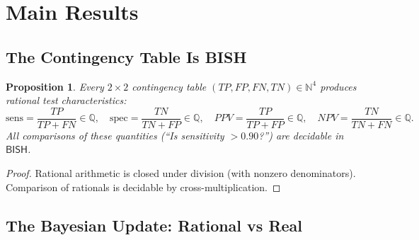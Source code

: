 \documentclass[11pt,a4paper]{article}
\theoremstyle{plain}
\newtheorem{proposition}[theorem]{Proposition}
\theoremstyle{definition}
\newcommand{\BISH}{\textsf{BISH}}
\newcommand{\Q}{\mathbb{Q}}
\newcommand{\N}{\mathbb{N}}
\begin{document}
\section{Main Results}\label{sec:main}

\subsection{The Contingency Table Is BISH}

\begin{proposition}\label{prop:ct-bish}
Every $2 \times 2$ contingency table $(TP, FP, FN, TN) \in \N^4$ produces rational test characteristics:
\[
  \mathrm{sens} = \frac{TP}{TP + FN} \in \Q, \quad
  \mathrm{spec} = \frac{TN}{TN + FP} \in \Q, \quad
  PPV = \frac{TP}{TP + FP} \in \Q, \quad
  NPV = \frac{TN}{TN + FN} \in \Q.
\]
All comparisons of these quantities (``Is sensitivity $> 0.90$?'') are decidable in $\BISH$.
\end{proposition}

\begin{proof}
Rational arithmetic is closed under division (with nonzero denominators).  Comparison of rationals is decidable by cross-multiplication.
\end{proof}

\subsection{The Bayesian Update: Rational vs Real}
\end{document}
